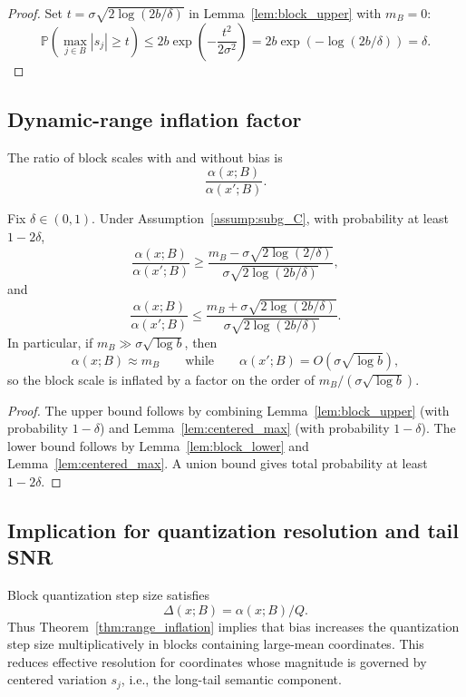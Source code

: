 \begin{proof}
Set $t=\sigma\sqrt{2\log(2b/\delta)}$ in Lemma~\ref{lem:block_upper} with $m_B=0$:
\[
\mathbb{P}\!\left(\max_{j\in B}|s_j|\ge t\right)
\le 2b\exp\!\left(-\frac{t^2}{2\sigma^2}\right)
= 2b\exp\!\left(-\log(2b/\delta)\right)=\delta.
\]
\end{proof}

\subsection{Dynamic-range inflation factor}

The ratio of block scales with and without bias is
\[
\frac{\alpha(x;B)}{\alpha(x';B)}.
\]

\begin{theorem}
\label{thm:range_inflation}
Fix $\delta\in(0,1)$.
Under Assumption~\ref{assump:subg_C}, with probability at least $1-2\delta$,
\[
\frac{\alpha(x;B)}{\alpha(x';B)}
\ge
\frac{m_B - \sigma\sqrt{2\log(2/\delta)}}{\sigma\sqrt{2\log(2b/\delta)}},
\]
and
\[
\frac{\alpha(x;B)}{\alpha(x';B)}
\le
\frac{m_B + \sigma\sqrt{2\log(2b/\delta)}}{\sigma\sqrt{2\log(2b/\delta)}}.
\]
In particular, if $m_B \gg \sigma\sqrt{\log b}$, then
\[
\alpha(x;B) \approx m_B
\qquad\text{while}\qquad
\alpha(x';B) = O(\sigma\sqrt{\log b}),
\]
so the block scale is inflated by a factor on the order of $m_B / (\sigma\sqrt{\log b})$.
\end{theorem}

\begin{proof}
The upper bound follows by combining Lemma~\ref{lem:block_upper} (with probability
$1-\delta$) and Lemma~\ref{lem:centered_max} (with probability $1-\delta$).
The lower bound follows by Lemma~\ref{lem:block_lower} and Lemma~\ref{lem:centered_max}.
A union bound gives total probability at least $1-2\delta$.
\end{proof}

\subsection{Implication for quantization resolution and tail SNR}

Block quantization step size satisfies
\[
\Delta(x;B) = \alpha(x;B)/Q.
\]
Thus Theorem~\ref{thm:range_inflation} implies that bias increases the quantization
step size multiplicatively in blocks containing large-mean coordinates.
This reduces effective resolution for coordinates whose magnitude is governed by
centered variation $s_j$, i.e., the long-tail semantic component.

